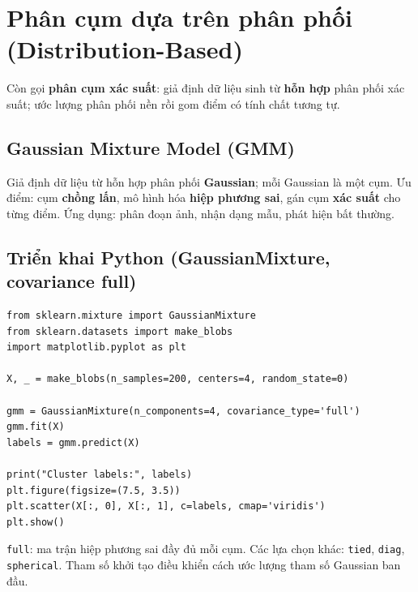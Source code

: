\section{Phân cụm dựa trên phân phối (Distribution-Based)}
\label{sec:distribution-based}

\begin{dinhnghia}[title={Phân cụm dựa trên phân phối}]
Còn gọi \textbf{phân cụm xác suất}: giả định dữ liệu sinh từ \textbf{hỗn hợp} phân phối xác suất;
ước lượng phân phối nền rồi gom điểm có tính chất tương tự.
\end{dinhnghia}

\subsection{Gaussian Mixture Model (GMM)}

\begin{dinhnghia}[title={GMM}]
Giả định dữ liệu từ hỗn hợp phân phối \textbf{Gaussian}; mỗi Gaussian là một cụm.
Ưu điểm: cụm \textbf{chồng lấn}, mô hình hóa \textbf{hiệp phương sai}, gán cụm \textbf{xác suất} cho từng điểm.
Ứng dụng: phân đoạn ảnh, nhận dạng mẫu, phát hiện bất thường.
\end{dinhnghia}

\subsection{Triển khai Python (GaussianMixture, covariance full)}

\begin{vidu}[title={Ví dụ GMM}]
\begin{lstlisting}
from sklearn.mixture import GaussianMixture
from sklearn.datasets import make_blobs
import matplotlib.pyplot as plt

X, _ = make_blobs(n_samples=200, centers=4, random_state=0)

gmm = GaussianMixture(n_components=4, covariance_type='full')
gmm.fit(X)
labels = gmm.predict(X)

print("Cluster labels:", labels)
plt.figure(figsize=(7.5, 3.5))
plt.scatter(X[:, 0], X[:, 1], c=labels, cmap='viridis')
plt.show()
\end{lstlisting}
\end{vidu}

\begin{ynghia}[title={covariance\_type}]
\texttt{full}: ma trận hiệp phương sai đầy đủ mỗi cụm.
Các lựa chọn khác: \texttt{tied}, \texttt{diag}, \texttt{spherical}.
Tham số khởi tạo điều khiển cách ước lượng tham số Gaussian ban đầu.
\end{ynghia}

